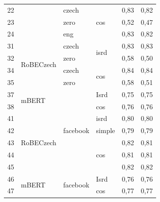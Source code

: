 \begin{table}[]
{\begin{tabular}{|l|l|l|l||ll|}
22 &                            & czech                     & \multirow{3}{*}{cos}  & 0,83   & 0,82 \\ \cline{1-1} \cline{3-3} \cline{5-6} 
23 &                            & zero                      &                       & 0,52   & 0,47 \\ \cline{1-1} \cline{3-3} \cline{5-6} 
24 &                            & eng                       &                       & 0,83   & 0,82 \\ \hline
31 & \multirow{4}{*}{RoBECzech} & czech                     & \multirow{2}{*}{isrd} & 0,83   & 0,83 \\ \cline{1-1} \cline{3-3} \cline{5-6} 
32 &                            & zero                      &                       & 0,58   & 0,50 \\ \cline{1-1} \cline{3-6} 
34 &                            & czech                     & \multirow{2}{*}{cos}  & 0,84   & 0,84 \\ \cline{1-1} \cline{3-3} \cline{5-6} 
35 &                            & zero                      &                       & 0,58   & 0,51 \\ \hline
37 & \multirow{2}{*}{mBERT}     & \multirow{7}{*}{facebook} & Isrd                  & 0,75   & 0,75 \\ \cline{1-1} \cline{4-6} 
38 &                            &                           & cos                   & 0,76   & 0,76 \\ \cline{1-2} \cline{4-6} 
41 & \multirow{5}{*}{RoBECzech} &                           & isrd                  & 0,80   & 0,80 \\ \cline{1-1} \cline{4-6} 
42 &                            &                           & simple                & 0,79   & 0,79 \\ \cline{1-1} \cline{4-6} 
43 &                            &                           & \multirow{3}{*}{cos}  & 0,82   & 0,81 \\ \cline{1-1} \cline{5-6} 
44 &                            &                           &                       & 0,81   & 0,81 \\ \cline{1-1} \cline{5-6} 
45 &                            &                           &                       & 0,82 & 0,82 \\ \hline
46 & \multirow{2}{*}{mBERT}     & \multirow{4}{*}{facebook} & Isrd                  & 0,76   & 0,76 \\ \cline{1-1} \cline{4-6} 
47 &                            &                           & cos                   & 0,77   & 0,77 \\ \cline{1-2} \cline{4-6} 

\end{tabular}}
\end{table}
